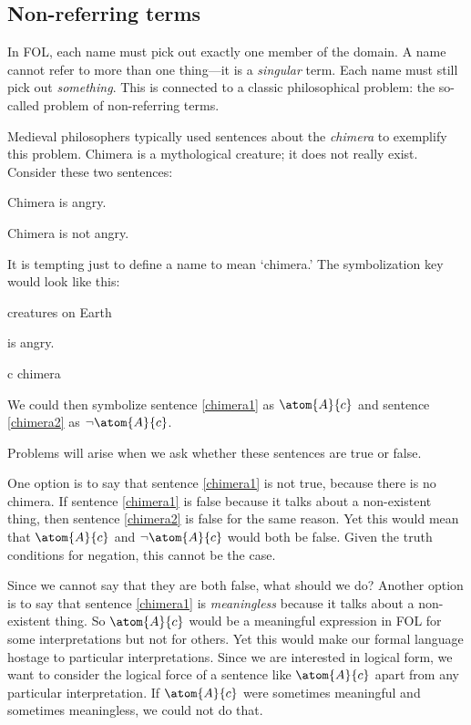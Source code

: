 \subsection{Non-referring terms}

In FOL, each name must pick out exactly one member of the domain. A name cannot refer to more than one thing---it is a \emph{singular} term. Each name must still pick out \emph{something}. This is connected to a classic philosophical problem: the so-called problem of non-referring terms.

Medieval philosophers typically used sentences about the \emph{chimera} to exemplify this problem. Chimera is a mythological creature; it does not really exist. Consider these two sentences:
\begin{earg}
\item[\ex{chimera1}] Chimera is angry.
\item[\ex{chimera2}] Chimera is not angry.
\end{earg}
It is tempting just to define a name to mean `chimera.' The symbolization key would look like this:
\begin{ekey}
\item[\text{domain}] creatures on Earth
\item[\atom{A}{x}]  is angry.
\item[c] chimera
\end{ekey}
We could then symbolize sentence \ref{chimera1} as $\atom{A}{c}$ and sentence \ref{chimera2} as $\enot \atom{A}{c}$.

Problems will arise when we ask whether these sentences are true or false.

One option is to say that sentence \ref{chimera1} is not true, because there is no chimera. If sentence \ref{chimera1} is false because it talks about a non-existent thing, then sentence \ref{chimera2} is false for the same reason. Yet this would mean that $\atom{A}{c}$ and $\enot \atom{A}{c}$ would both be false. Given the truth conditions for negation, this cannot be the case.

Since we cannot say that they are both false, what should we do? Another option is to say that sentence \ref{chimera1} is \emph{meaningless} because it talks about a non-existent thing. So $\atom{A}{c}$ would be a meaningful expression in FOL for some interpretations but not for others. Yet this would make our formal language hostage to particular interpretations. Since we are interested in logical form, we want to consider the logical force of a sentence like $\atom{A}{c}$ apart from any particular interpretation. If $\atom{A}{c}$ were sometimes meaningful and sometimes meaningless, we could not do that.

